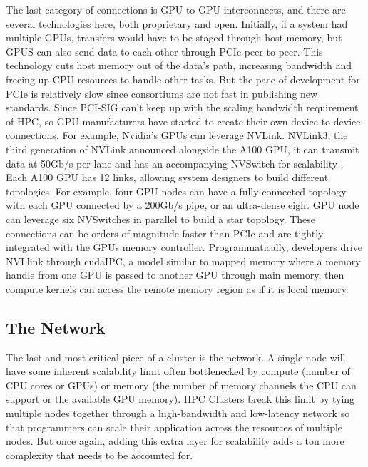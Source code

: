 The last category of connections is GPU to GPU interconnects, and there are several technologies here, both proprietary and open.
Initially, if a system had multiple GPUs, transfers would have to be staged through host memory, but GPUS can also send data to each other through PCIe peer-to-peer.
This technology cuts host memory out of the data's path, increasing bandwidth and freeing up CPU resources to handle other tasks.
But the pace of development for PCIe is relatively slow since consortiums are not fast in publishing new standards. 
Since PCI-SIG can't keep up with the scaling bandwidth requirement of HPC, so GPU manufacturers have started to create their own device-to-device connections.
For example, Nvidia's GPUs can leverage NVLink.
NVLink3, the third generation of NVLink announced alongside the A100 GPU, it can transmit data at 50Gb/s per lane and has an accompanying NVSwitch for scalability \cite{A100Whitepaper}.
Each A100 GPU has 12 links, allowing system designers to build different topologies.
For example, four GPU nodes can have a fully-connected topology with each GPU connected by a 200Gb/s pipe, or an ultra-dense eight GPU node can leverage six NVSwitches in parallel to build a star topology.
These connections can be orders of magnitude faster than PCIe and are tightly integrated with the GPUs memory controller.
Programmatically, developers drive NVLlink through cudaIPC, a model similar to mapped memory where a memory handle from one GPU is passed to another GPU through main memory, then compute kernels can access the remote memory region as if it is local memory.

\subsection{The Network}
The last and most critical piece of a cluster is the network.  
A single node will have some inherent scalability limit often bottlenecked by compute (number of CPU cores or GPUs) or memory (the number of memory channels the CPU can support or the available GPU memory).
HPC Clusters break this limit by tying multiple nodes together through a high-bandwidth and low-latency network so that programmers can scale their application across the resources of multiple nodes.
But once again, adding this extra layer for scalability adds a ton more complexity that needs to be accounted for.



